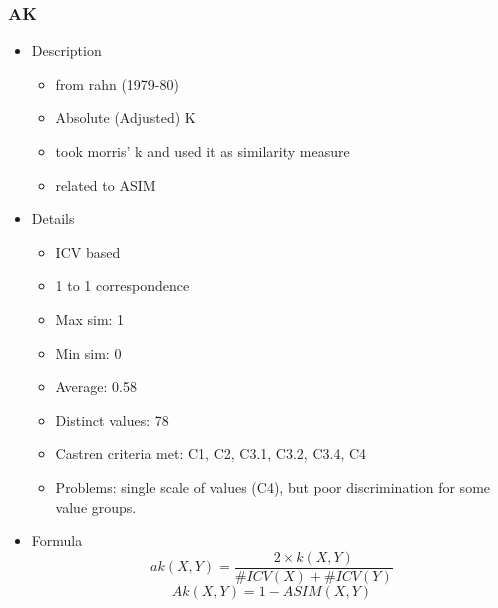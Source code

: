 \documentclass{article}
\begin{document}
\subsubsection{AK}
\label{sec-6-6-1}
\begin{itemize}

\item Description
\label{sec-6-6-1-1}%
\begin{itemize}
\item from rahn (1979-80)
\item Absolute (Adjusted) K
\item took morris' k and used it as similarity measure
\item related to ASIM
\end{itemize}

\item Details
\label{sec-6-6-1-2}%
\begin{itemize}
\item ICV based
\item 1 to 1 correspondence
\item Max sim: 1
\item Min sim: 0
\item Average: 0.58
\item Distinct values: 78
\item Castren criteria met: C1, C2, C3.1, C3.2, C3.4, C4
\item Problems: single scale of values (C4), but poor discrimination for
  some value groups.
\end{itemize}

\item Formula\\
\label{sec-6-6-1-3}%
$$ ak\left(X,Y\right)=\frac{2\times k\left(X,Y\right)}{\#ICV\left(X\right)+\#ICV\left(Y\right)} $$
$$ Ak(X,Y)=1-ASIM(X,Y) $$
\end{itemize} %
\end{document}
